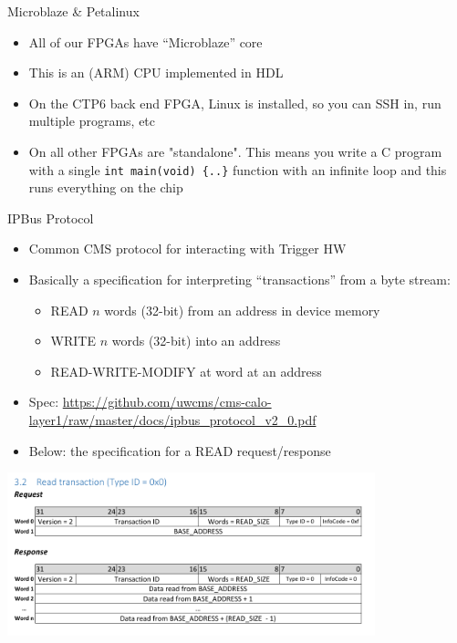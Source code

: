 \documentclass{beamer}
\begin{document}
\begin{frame}{Microblaze \& Petalinux}
\begin{itemize}
\item All of our FPGAs have ``Microblaze'' core
\item This is an (ARM) CPU implemented in HDL
\item On the CTP6 back end FPGA, Linux is installed, so you can SSH in, run multiple programs, etc
\item On all other FPGAs are "standalone". This means you write a C program with a single {\tt int main(void) \{..\}} function
with an infinite loop and this runs everything on the chip
\end{itemize}
\end{frame}

\begin{frame}{IPBus Protocol}
\begin{itemize}
\item Common CMS protocol for interacting with Trigger HW
\item Basically a specification for interpreting ``transactions'' from a byte stream:
\begin{itemize}
\item READ $n$ words (32-bit) from an address in device memory 
\item WRITE $n$ words (32-bit) into an address
\item READ-WRITE-MODIFY at word at an address
\end{itemize}
\item Spec: \url{https://github.com/uwcms/cms-calo-layer1/raw/master/docs/ipbus_protocol_v2_0.pdf}
\item Below: the specification for a READ request/response
\end{itemize}
\begin{center}
\includegraphics[width=0.8\textwidth]{images/ipbus_read.pdf}
\end{center}
\end{frame}
\end{document}

